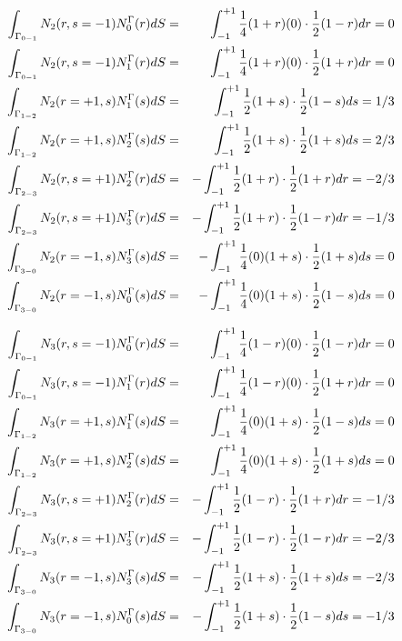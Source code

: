 \begin{eqnarray}
\int_{\Gamma_{0-1}} N_2(r,s=-1) N_0^\Gamma(r) dS  &=&  \int_{-1}^{+1} \frac{1}{4}(1+r)(0)  \cdot  \frac{1}{2}(1-r) dr= 0\nonumber\\
\int_{\Gamma_{0-1}} N_2(r,s=-1) N_1^\Gamma(r) dS  &=&  \int_{-1}^{+1} \frac{1}{4}(1+r)(0)  \cdot  \frac{1}{2}(1+r) dr= 0\nonumber\\
\int_{\Gamma_{1-2}} N_2(r=+1,s) N_1^\Gamma(s) dS  &=&  \int_{-1}^{+1} \frac{1}{2}(1+s)     \cdot  \frac{1}{2}(1-s) ds= 1/3 \nonumber\\
\int_{\Gamma_{1-2}} N_2(r=+1,s) N_2^\Gamma(s) dS  &=&  \int_{-1}^{+1} \frac{1}{2}(1+s)     \cdot  \frac{1}{2}(1+s) ds= 2/3 \nonumber\\
\int_{\Gamma_{2-3}} N_2(r,s=+1) N_2^\Gamma(r) dS  &=&  -\int_{-1}^{+1}\frac{1}{2}(1+r)     \cdot  \frac{1}{2}(1+r) dr= -2/3\nonumber\\
\int_{\Gamma_{2-3}} N_2(r,s=+1) N_3^\Gamma(r) dS  &=&  -\int_{-1}^{+1}\frac{1}{2}(1+r)     \cdot  \frac{1}{2}(1-r) dr= -1/3\nonumber\\
\int_{\Gamma_{3-0}} N_2(r=-1,s) N_3^\Gamma(s) dS  &=&  -\int_{-1}^{+1}\frac{1}{4}(0)(1+s)  \cdot  \frac{1}{2}(1+s) ds= 0\nonumber\\
\int_{\Gamma_{3-0}} N_2(r=-1,s) N_0^\Gamma(s) dS  &=&  -\int_{-1}^{+1}\frac{1}{4}(0)(1+s)  \cdot  \frac{1}{2}(1-s) ds= 0\nonumber
\end{eqnarray}

\begin{eqnarray}
\int_{\Gamma_{0-1}} N_3(r,s=-1) N_0^\Gamma(r) dS  &=&  \int_{-1}^{+1} \frac{1}{4}(1-r)(0) \cdot  \frac{1}{2}(1-r) dr= 0\nonumber\\
\int_{\Gamma_{0-1}} N_3(r,s=-1) N_1^\Gamma(r) dS  &=&  \int_{-1}^{+1} \frac{1}{4}(1-r)(0) \cdot  \frac{1}{2}(1+r) dr= 0\nonumber\\
\int_{\Gamma_{1-2}} N_3(r=+1,s) N_1^\Gamma(s) dS  &=&  \int_{-1}^{+1} \frac{1}{4}(0)(1+s) \cdot  \frac{1}{2}(1-s) ds= 0\nonumber\\
\int_{\Gamma_{1-2}} N_3(r=+1,s) N_2^\Gamma(s) dS  &=&  \int_{-1}^{+1} \frac{1}{4}(0)(1+s) \cdot  \frac{1}{2}(1+s) ds= 0\nonumber\\
\int_{\Gamma_{2-3}} N_3(r,s=+1) N_2^\Gamma(r) dS  &=&  -\int_{-1}^{+1}\frac{1}{2}(1-r)    \cdot  \frac{1}{2}(1+r) dr= -1/3\nonumber\\
\int_{\Gamma_{2-3}} N_3(r,s=+1) N_3^\Gamma(r) dS  &=&  -\int_{-1}^{+1}\frac{1}{2}(1-r)    \cdot  \frac{1}{2}(1-r) dr= -2/3\nonumber\\
\int_{\Gamma_{3-0}} N_3(r=-1,s) N_3^\Gamma(s) dS  &=&  -\int_{-1}^{+1}\frac{1}{2}(1+s)    \cdot  \frac{1}{2}(1+s) ds= -2/3\nonumber\\
\int_{\Gamma_{3-0}} N_3(r=-1,s) N_0^\Gamma(s) dS  &=&  -\int_{-1}^{+1}\frac{1}{2}(1+s)    \cdot  \frac{1}{2}(1-s) ds= -1/3\nonumber
\end{eqnarray}







